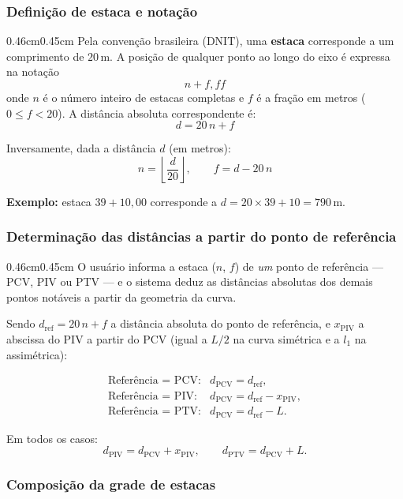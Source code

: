 \documentclass[12pt,letterpaper]{article}
\newenvironment{corpo}{\begin{adjustwidth}{0.46cm}{0.45cm}\justifying}{\end{adjustwidth}}
\begin{document}
\subsubsection*{Definição de estaca e notação}

\begin{corpo}
Pela convenção brasileira (DNIT), uma \textbf{estaca} corresponde a um comprimento de $20\,\text{m}$. A posição de qualquer ponto ao longo do eixo é expressa na notação
\[
 n + f{,}ff
\]
onde $n$ é o número inteiro de estacas completas e $f$ é a fração em metros ($0 \le f < 20$). A distância absoluta correspondente é:
\[
 d = 20\,n + f
\]

Inversamente, dada a distância $d$ (em metros):
\[
 n = \left\lfloor \frac{d}{20} \right\rfloor, \qquad f = d - 20\,n
\]

\textbf{Exemplo:} estaca $39 + 10{,}00$ corresponde a $d = 20 \times 39 + 10 = 790\,\text{m}$.
\end{corpo}

\subsubsection*{Determinação das distâncias a partir do ponto de referência}

\begin{corpo}
O usuário informa a estaca ($n$, $f$) de \emph{um} ponto de referência --- PCV, PIV ou PTV --- e o sistema deduz as distâncias absolutas dos demais pontos notáveis a partir da geometria da curva.

Sendo $d_{\mathrm{ref}} = 20\,n + f$ a distância absoluta do ponto de referência, e $x_{\mathrm{PIV}}$ a abscissa do PIV a partir do PCV (igual a $L/2$ na curva simétrica e a $l_1$ na assimétrica):

\[
\begin{array}{ll}
\text{Referência = PCV:} & d_{\mathrm{PCV}} = d_{\mathrm{ref}}, \\[4pt]
\text{Referência = PIV:} & d_{\mathrm{PCV}} = d_{\mathrm{ref}} - x_{\mathrm{PIV}}, \\[4pt]
\text{Referência = PTV:} & d_{\mathrm{PCV}} = d_{\mathrm{ref}} - L.
\end{array}
\]

Em todos os casos:
\[
 d_{\mathrm{PIV}} = d_{\mathrm{PCV}} + x_{\mathrm{PIV}}, \qquad d_{\mathrm{PTV}} = d_{\mathrm{PCV}} + L.
\]
\end{corpo}

\subsubsection*{Composição da grade de estacas}
\end{document}
